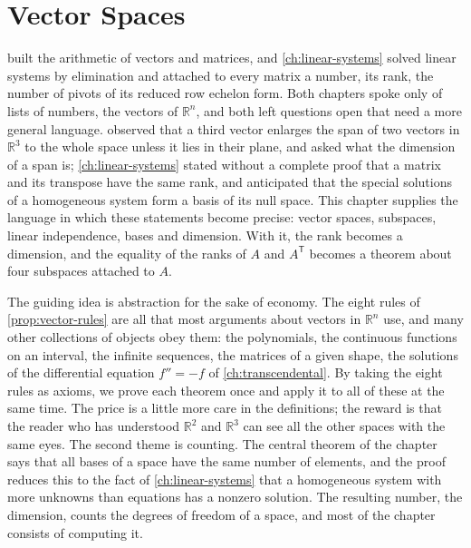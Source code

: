 \chapter{Vector Spaces}
\label{ch:vector-spaces}


 built the arithmetic of vectors and matrices, and \cref{ch:linear-systems} solved linear systems by elimination and attached to every matrix a number, its rank, the number of pivots of its reduced row echelon form. Both chapters spoke only of lists of numbers, the vectors of $\mathbb R^n$, and both left questions open that need a more general language.  observed that a third vector enlarges the span of two vectors in $\mathbb R^3$ to the whole space unless it lies in their plane, and asked what the dimension of a span is; \cref{ch:linear-systems} stated without a complete proof that a matrix and its transpose have the same rank, and anticipated that the special solutions of a homogeneous system form a basis of its null space. This chapter supplies the language in which these statements become precise: vector spaces, subspaces, linear independence, bases and dimension. With it, the rank becomes a dimension, and the equality of the ranks of $A$ and $A^{\mathsf T}$ becomes a theorem about four subspaces attached to $A$.

The guiding idea is abstraction for the sake of economy. The eight rules of \cref{prop:vector-rules} are all that most arguments about vectors in $\mathbb R^n$ use, and many other collections of objects obey them: the polynomials, the continuous functions on an interval, the infinite sequences, the matrices of a given shape, the solutions of the differential equation $f''=-f$ of \cref{ch:transcendental}. By taking the eight rules as axioms, we prove each theorem once and apply it to all of these at the same time. The price is a little more care in the definitions; the reward is that the reader who has understood $\mathbb R^2$ and $\mathbb R^3$ can see all the other spaces with the same eyes. The second theme is counting. The central theorem of the chapter says that all bases of a space have the same number of elements, and the proof reduces this to the fact of \cref{ch:linear-systems} that a homogeneous system with more unknowns than equations has a nonzero solution. The resulting number, the dimension, counts the degrees of freedom of a space, and most of the chapter consists of computing it.

